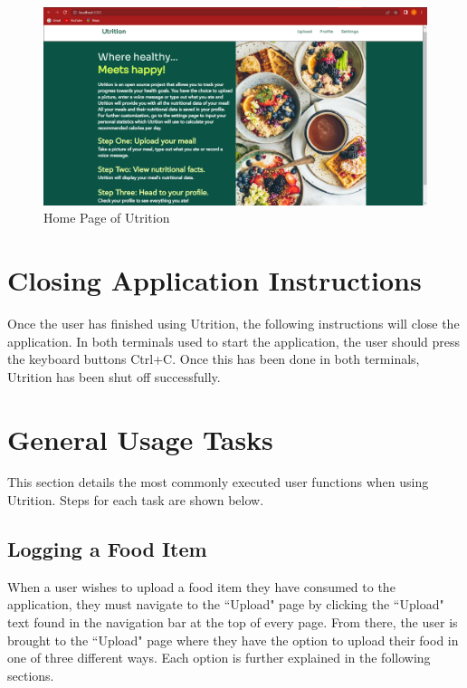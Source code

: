 \documentclass{article}
\begin{document}
\begin{figure}[H]
	\centering
	\includegraphics[scale=0.30]{homepage.png}
	\caption{Home Page of Utrition}
\end{figure}

\section{Closing Application Instructions}
Once the user has finished using Utrition, the following instructions will close the application. In both terminals used to start the application, the user should press the keyboard buttons Ctrl+C. Once this has been done in both terminals, Utrition has been shut off successfully.

\section{General Usage Tasks}
This section details the most commonly executed user functions when using Utrition. Steps for each task are shown below.
\subsection{Logging a Food Item}
When a user wishes to upload a food item they have consumed to the application, they must navigate to the ``Upload" page by clicking the ``Upload" text found in the navigation bar at the top of every page. From there, the user is brought to the ``Upload" page where they have the option to upload their food in one of three different ways. Each option is further explained in the following sections.
\end{document}
